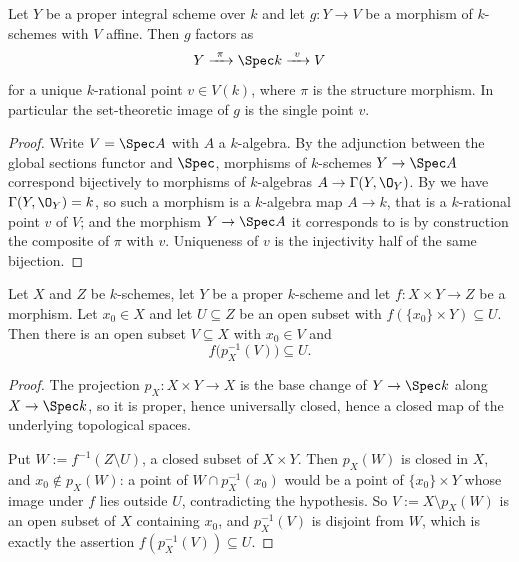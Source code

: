 \begin{lemma}\label{lem:cube-constant-to-affine}
Let $Y$ be a proper integral scheme over $k$ and let $g\colon Y\to V$ be a
morphism of $k$-schemes with $V$ affine.  Then $g$ factors as
\[
  Y\xrightarrow{\ \pi\ }\Spec k\xrightarrow{\ v\ }V
\]
for a unique $k$-rational point $v\in V(k)$, where $\pi$ is the structure
morphism.  In particular the set-theoretic image of $g$ is the single point
$v$.
\end{lemma}
\begin{proof}
Write $V=\Spec A$ with $A$ a $k$-algebra.  By the adjunction between the
global sections functor and $\Spec$, morphisms of $k$-schemes $Y\to\Spec A$
correspond bijectively to morphisms of $k$-algebras $A\to\Gamma(Y,\O_Y)$.  By
 we have $\Gamma(Y,\O_Y)=k$, so such a
morphism is a $k$-algebra map $A\to k$, that is a $k$-rational point $v$ of
$V$; and the morphism $Y\to\Spec A$ it corresponds to is by construction the
composite of $\pi$ with $v$.  Uniqueness of $v$ is the injectivity half of the
same bijection.
\end{proof}

\begin{lemma}
\label{lem:cube-collapse-neighbourhood}
Let $X$ and $Z$ be $k$-schemes, let $Y$ be a proper $k$-scheme and let
$f\colon X\times Y\to Z$ be a morphism.  Let $x_0\in X$ and let $U\subseteq Z$
be an open subset with $f(\{x_0\}\times Y)\subseteq U$.  Then there is an open
subset $V\subseteq X$ with $x_0\in V$ and
\[
  f\bigl(p_X^{-1}(V)\bigr)\subseteq U .
\]
\end{lemma}
\begin{proof}
The projection $p_X\colon X\times Y\to X$ is the base change of
$Y\to\Spec k$ along $X\to\Spec k$, so it is proper, hence universally closed,
hence a closed map of the underlying topological spaces.

Put $W:=f^{-1}(Z\setminus U)$, a closed subset of $X\times Y$.  Then
$p_X(W)$ is closed in $X$, and $x_0\notin p_X(W)$: a point of
$W\cap p_X^{-1}(x_0)$ would be a point of $\{x_0\}\times Y$ whose image under
$f$ lies outside $U$, contradicting the hypothesis.  So
$V:=X\setminus p_X(W)$ is an open subset of $X$ containing $x_0$, and
$p_X^{-1}(V)$ is disjoint from $W$, which is exactly the assertion
$f(p_X^{-1}(V))\subseteq U$.
\end{proof}

